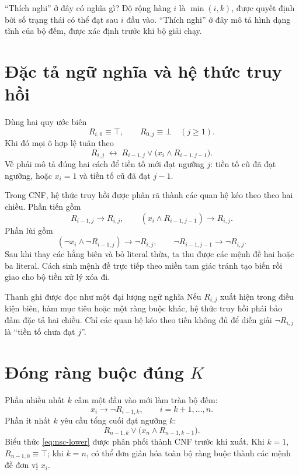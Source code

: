 \begin{keyidea}{``Thích nghi'' ở đây có nghĩa gì?}
Độ rộng hàng \(i\) là \(\min(i,k)\), được quyết định bởi số trạng thái có thể
đạt sau \(i\) đầu vào. ``Thích nghi'' ở đây mô tả hình dạng tĩnh của bộ đếm,
được xác định trước khi bộ giải chạy.
\end{keyidea}

\section{Đặc tả ngữ nghĩa và hệ thức truy hồi}

Dùng hai quy ước biên
\[
  R_{i,0}\equiv\top,
  \qquad
  R_{0,j}\equiv\bot\quad(j\ge1).
\]
Khi đó mọi ô hợp lệ tuân theo
\begin{equation}
  R_{i,j}
  \;\longleftrightarrow\;
  R_{i-1,j}\lor
  \bigl(x_i\land R_{i-1,j-1}\bigr).
  \label{eq:nsc-recurrence}
\end{equation}
Vế phải mô tả đúng hai cách để tiền tố mới đạt ngưỡng \(j\): tiền tố cũ đã đạt
ngưỡng, hoặc \(x_i=1\) và tiền tố cũ đã đạt \(j-1\).

Trong CNF, hệ thức truy hồi được phân rã thành các quan hệ kéo theo theo hai chiều. Phần
tiến gồm
\[
  R_{i-1,j}\rightarrow R_{i,j},
  \qquad
  (x_i\land R_{i-1,j-1})\rightarrow R_{i,j}.
\]
Phần lùi gồm
\[
  (\neg x_i\land\neg R_{i-1,j})\rightarrow\neg R_{i,j},
  \qquad
  \neg R_{i-1,j-1}\rightarrow\neg R_{i,j}.
\]
Sau khi thay các hằng biên và bỏ literal thừa, ta thu được các mệnh đề hai hoặc
ba literal. Cách sinh mệnh đề trực tiếp theo miền tam giác tránh tạo biến rồi
giao cho bộ tiền xử lý xóa đi.

\begin{designrule}{Thanh ghi được đọc như một đại lượng ngữ nghĩa}
Nếu \(R_{i,j}\) xuất hiện trong điều kiện biên, hàm mục tiêu hoặc một ràng buộc
khác, hệ thức truy hồi phải bảo đảm đặc tả hai chiều. Chỉ các quan hệ kéo theo
tiến không đủ để diễn giải \(\neg R_{i,j}\) là ``tiền tố chưa đạt \(j\)''.
\end{designrule}

\section{Đóng ràng buộc \texorpdfstring{đúng \(K\)}{đúng K}}

Phần nhiều nhất \(k\) cấm một đầu vào mới làm tràn bộ đếm:
\begin{equation}
  x_i\rightarrow\neg R_{i-1,k},
  \qquad i=k+1,\ldots,n.
  \label{eq:nsc-overflow}
\end{equation}
Phần ít nhất \(k\) yêu cầu tổng cuối đạt ngưỡng \(k\):
\begin{equation}
  R_{n-1,k}\lor
  \bigl(x_n\land R_{n-1,k-1}\bigr).
  \label{eq:nsc-lower}
\end{equation}
Biểu thức \cref{eq:nsc-lower} được phân phối thành CNF trước khi xuất. Khi
\(k=1\), \(R_{n-1,0}\equiv\top\); khi \(k=n\), có thể đơn giản hóa toàn bộ
ràng buộc thành các mệnh đề đơn vị \(x_i\).

